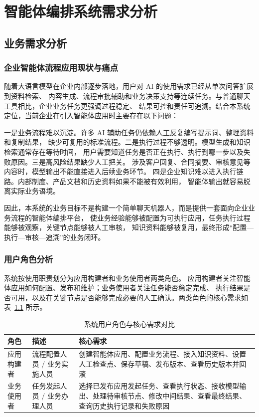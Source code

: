
\chapter{智能体编排系统需求分析}

\section{业务需求分析}

\subsection{企业智能体流程应用现状与痛点}

随着大语言模型在企业内部逐步落地，用户对 AI 的使用需求已经从单次问答扩展到资料检索、
内容生成、流程审批辅助和业务决策支持等连续任务。与普通聊天工具相比，企业业务任务更强调过程稳定、
结果可控和责任可追溯。结合本系统定位，当前企业在引入智能体应用时主要存在以下问题：

一是业务流程难以沉淀。许多 AI 辅助任务仍依赖人工反复编写提示词、整理资料和复制结果，
缺少可复用的标准流程。二是执行过程不够透明。模型生成和知识检索通常存在等待时间，
用户需要知道任务是否正在执行、执行到哪一步以及失败原因。三是高风险结果缺少人工把关。
涉及客户回复、合同摘要、审核意见等内容时，模型输出不能直接进入后续业务环节。
四是企业知识难以进入执行链路。内部制度、产品文档和历史资料如果不能被有效利用，
智能体输出就容易脱离实际业务语境。

因此，本系统的业务目标不是构建一个简单聊天机器人，而是提供一套面向企业业务流程的智能体编排平台，
使业务经验能够被配置为可执行应用，任务执行过程能够被观察，关键节点能够被人工审核，
知识资料能够被复用，最终形成“配置—执行—审核—追溯”的业务闭环。

\subsection{用户角色分析}

系统按使用职责划分为应用构建者和业务使用者两类角色。
应用构建者关注智能体应用如何配置、发布和维护；业务使用者关注任务能否稳定完成、
执行结果是否可用，以及在关键节点是否能够完成必要的人工确认。两类角色的核心需求如表~\ref{tab:roles} 所示。

\begin{table}[H]
  \centering
  \caption{系统用户角色与核心需求对比}
  \label{tab:roles}
  \small
  \begin{tabularx}{\textwidth}{p{2.2cm}p{3.0cm}X}
    \toprule
    角色 & 描述 & 核心需求 \\
    \midrule
    应用构建者 & 流程配置人员 / 业务实施人员 & 创建智能体应用、配置业务流程、接入知识资料、设置人工检查点、保存草稿、发布版本、查看历史版本并回滚 \\
    业务使用者 & 任务发起人员 / 业务办理人员 & 选择已发布应用发起任务、查看执行状态、接收模型输出、处理待审核节点、修改中间结果、查看最终结果、查询历史执行记录和失败原因 \\
    \bottomrule
  \end{tabularx}
\end{table}

